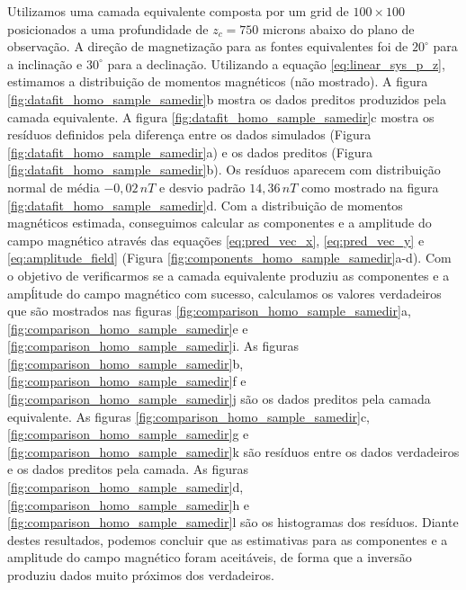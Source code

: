 Utilizamos uma camada equivalente composta por um grid de $100 \times 100$ posicionados a uma profundidade de $z_c = 750$ microns abaixo do plano de observação. A direção de magnetização para as fontes equivalentes foi de $20^\circ$ para a inclinação e $30^\circ$ para a declinação. Utilizando a equação \ref{eq:linear_sys_p_z}, estimamos a distribuição de momentos magnéticos (não mostrado). A figura \ref{fig:datafit_homo_sample_samedir}b mostra os dados preditos produzidos pela camada equivalente. A figura \ref{fig:datafit_homo_sample_samedir}c mostra os resíduos definidos pela diferença entre os dados simulados (Figura \ref{fig:datafit_homo_sample_samedir}a) e os dados preditos (Figura \ref{fig:datafit_homo_sample_samedir}b). Os resíduos aparecem com distribuição normal de média $-0,02 \, nT$ e desvio padrão $14,36 \, nT$ como mostrado na figura \ref{fig:datafit_homo_sample_samedir}d. Com a distribuição de momentos magnéticos estimada, conseguimos calcular as componentes e a amplitude do campo magnético através das equações \ref{eq:pred_vec_x}, \ref{eq:pred_vec_y} e \ref{eq:amplitude_field} (Figura \ref{fig:components_homo_sample_samedir}a-d). Com o objetivo de verificarmos se a camada equivalente produziu as componentes e a ampĺitude do campo magnético com sucesso, calculamos os valores verdadeiros que são mostrados nas  figuras \ref{fig:comparison_homo_sample_samedir}a, \ref{fig:comparison_homo_sample_samedir}e e \ref{fig:comparison_homo_sample_samedir}i. As figuras \ref{fig:comparison_homo_sample_samedir}b, \ref{fig:comparison_homo_sample_samedir}f e \ref{fig:comparison_homo_sample_samedir}j são os dados preditos pela camada equivalente. As figuras \ref{fig:comparison_homo_sample_samedir}c, \ref{fig:comparison_homo_sample_samedir}g e \ref{fig:comparison_homo_sample_samedir}k são resíduos entre os dados verdadeiros e os dados preditos pela camada. As figuras \ref{fig:comparison_homo_sample_samedir}d, \ref{fig:comparison_homo_sample_samedir}h e \ref{fig:comparison_homo_sample_samedir}l são os histogramas dos resíduos. Diante destes resultados, podemos concluir que as estimativas para as componentes e a amplitude do campo magnético foram aceitáveis, de forma que a inversão produziu dados muito próximos dos verdadeiros.  


